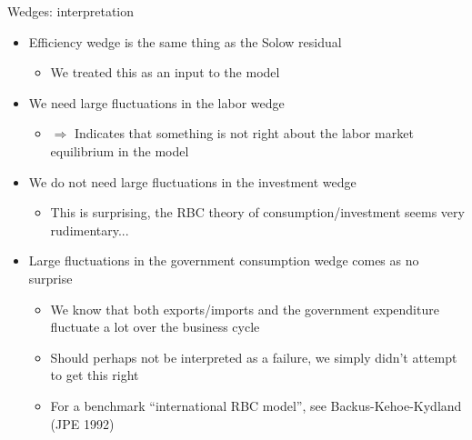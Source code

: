 \documentclass[9pt,xcolor={dvipsnames}]{beamer}
\newcommand{\bit}{\begin{itemize}}
\newcommand{\eit}{\end{itemize}}
\newcommand{\bc}{\color{blue}}
\begin{document}
\begin{frame}{Wedges: interpretation}

\bit
\setlength\itemsep{1.5em} 

\item Efficiency wedge is the same thing as the Solow residual
\bit
	\item We treated this as an {\bc input} to the model 
\eit

\item We need large fluctuations in the labor wedge
\bit
	\item $\Rightarrow$ Indicates that something is not right about the labor market equilibrium in the model
\eit

\item We do not need large fluctuations in the investment wedge
\bit
\setlength\itemsep{0.5em} 
	\item This is surprising, the RBC theory of consumption/investment seems very rudimentary...
\eit

\item Large fluctuations in the government consumption wedge comes as no surprise
\bit
\setlength\itemsep{0.5em}
	\item We know that both exports/imports and the government expenditure fluctuate a lot over the business cycle
	
	\item Should perhaps not be interpreted as a failure, we simply didn't attempt to get this right
	
	\item For a benchmark ``international RBC model'', see Backus-Kehoe-Kydland (JPE 1992)
\eit

\eit

\end{frame}
\end{document}
